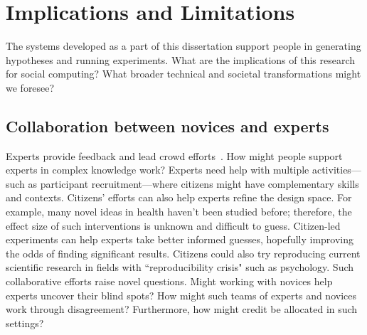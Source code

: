 
\section{Implications and Limitations}

The systems developed as a part of this dissertation support people in generating hypotheses and running experiments. What are the implications of this research for social computing? What broader technical and societal transformations might we foresee?

\subsection{Collaboration between novices and experts}
Experts provide feedback and lead crowd efforts~\cite{dow2012shepherding}. How might people support experts in complex knowledge work? Experts need help with multiple activities---such as participant recruitment---where citizens might have complementary skills and contexts. Citizens' efforts can also help experts refine the design space. For example, many novel ideas in health haven't been studied before; therefore, the effect size of such interventions is unknown and difficult to guess. Citizen-led experiments can help experts take better informed guesses, hopefully improving the odds of finding significant results. Citizens could also try reproducing current scientific research in fields with ``reproducibility crisis" such as psychology. Such collaborative efforts raise novel questions. Might working with novices help experts uncover their blind spots? How might such teams of experts and novices work through disagreement? Furthermore, how might credit be allocated in such settings? 


